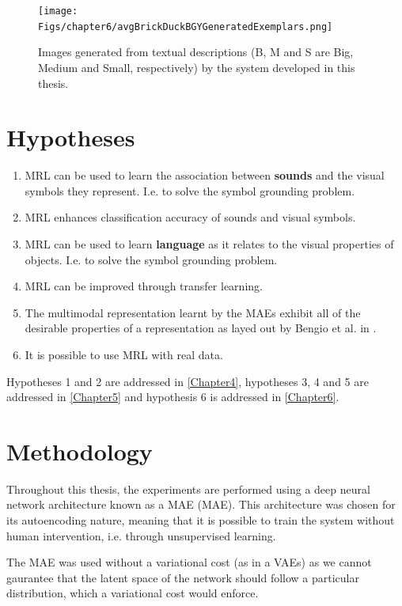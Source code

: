 \begin{figure}
\centering

\texttt{[image: Figs/chapter6/avgBrickDuckBGYGeneratedExemplars.png]}
\caption{Images generated from textual descriptions (B, M and S are Big, Medium and Small, respectively) by the system developed in this thesis.}
\label{fig:mrl_teaser}
\end{figure}

\section{Hypotheses}


\begin{enumerate}

	\item \ac{MRL} can be used to learn the association between \textbf{sounds} and the visual symbols they represent. I.e. to solve the symbol grounding problem.
	\item \ac{MRL} enhances classification accuracy of sounds and visual symbols.
	\item \ac{MRL} can be used to learn \textbf{language} as it relates to the visual properties of objects. I.e. to solve the symbol grounding problem.
	\item \ac{MRL} can be improved through transfer learning.
	\item The multimodal representation learnt by the \acp{MAE} exhibit all of the desirable properties of a representation as layed out by Bengio et al. in \cite{repRev}.		
	\item It is possible to use \ac{MRL} with real data.
	
\end{enumerate}

Hypotheses 1 and 2 are addressed in \autoref{Chapter4}, hypotheses 3, 4 and 5 are addressed in \autoref{Chapter5} and hypothesis 6 is addressed in \autoref{Chapter6}.


\section{Methodology}
Throughout this thesis, the experiments are performed using a deep neural network architecture known as a \acl{MAE} (\ac{MAE}). This architecture was chosen for its autoencoding nature, meaning that it is possible to train the system without human intervention, i.e. through unsupervised learning. 

The \ac{MAE} was used without a variational cost (as in a \acp{VAE}) as we cannot gaurantee that the latent space of the network should follow a particular distribution, which a variational cost would enforce.

